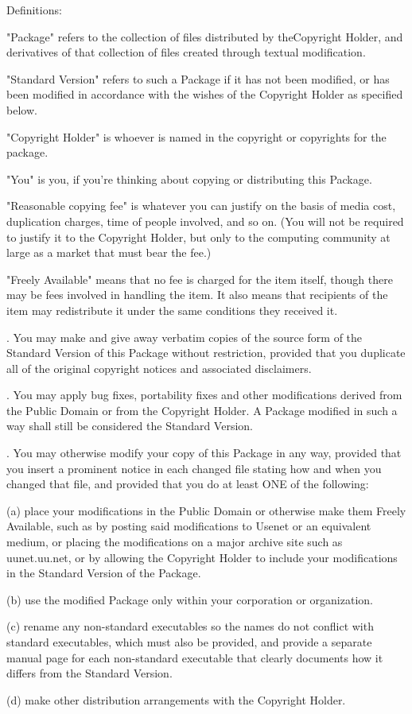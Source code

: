 \documentclass[10pt,letterpaper]{report}
\newenvironment{lquote}{\begin{list}{}{}\item[]}{\end{list}}
\begin{document}
\noindent
Definitions:
\begin{lquote}
"Package" refers to the collection of files distributed by the\linebreak Copyright Holder, and derivatives of that collection of files created through textual modification.

"Standard Version" refers to such a Package if it has not been modified, or has been modified in accordance with the wishes of the Copyright Holder as specified below.

"Copyright Holder" is whoever is named in the copyright or copyrights for the package.

"You" is you, if you're thinking about copying or distributing this Package.

"Reasonable copying fee" is whatever you can justify on the basis of media cost, duplication charges, time of people involved, and so on.  (You will not be required to justify it to the Copyright Holder, but only to the computing community at large as a market that must bear the fee.)

"Freely Available" means that no fee is charged for the item itself, though there may be fees involved in handling the item.  It also means that recipients of the item may redistribute it under the same conditions they received it.
\end{lquote}

. You may make and give away verbatim copies of the source form of the Standard Version of this Package without restriction, provided that you duplicate all of the original copyright notices and associated disclaimers.
\vspace{8pt}

. You may apply bug fixes, portability fixes and other modifications derived from the Public Domain or from the Copyright Holder.  A Package modified in such a way shall still be considered the Standard Version.
\vspace{8pt}

. You may otherwise modify your copy of this Package in any way, provided that you insert a prominent notice in each changed file stating how and when you changed that file, and provided that you do at least ONE of the following:

\begin{lquote}
(a) place your modifications in the Public Domain or otherwise make them Freely Available, such as by posting said modifications to Usenet or an equivalent medium, or placing the modifications on a major archive site such as uunet.uu.net, or by allowing the Copyright Holder to include your modifications in the Standard Version of the Package.

(b) use the modified Package only within your corporation or organization.

(c) rename any non-standard executables so the names do not conflict with standard executables, which must also be provided, and provide a separate manual page for each non-standard executable that clearly documents how it differs from the Standard Version.

(d) make other distribution arrangements with the Copyright Holder.
\end{lquote}
\end{document}
